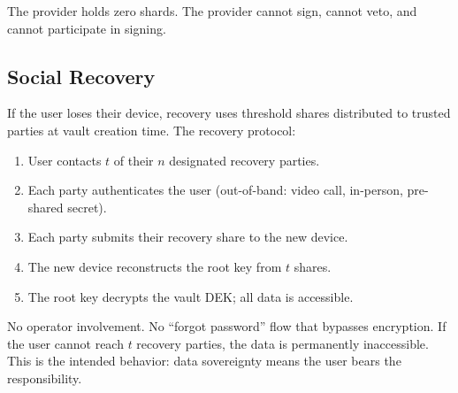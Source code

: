 The provider holds zero shards.  The provider cannot sign, cannot veto,
and cannot participate in signing.

\subsection{Social Recovery}

If the user loses their device, recovery uses threshold shares distributed
to trusted parties at vault creation time.  The recovery protocol:

\begin{enumerate}[nosep]
  \item User contacts $t$ of their $n$ designated recovery parties.
  \item Each party authenticates the user (out-of-band: video call, in-person,
        pre-shared secret).
  \item Each party submits their recovery share to the new device.
  \item The new device reconstructs the root key from $t$ shares.
  \item The root key decrypts the vault DEK; all data is accessible.
\end{enumerate}

No operator involvement.  No ``forgot password'' flow that bypasses
encryption.  If the user cannot reach $t$ recovery parties, the data is
permanently inaccessible.  This is the intended behavior: data sovereignty
means the user bears the responsibility.

